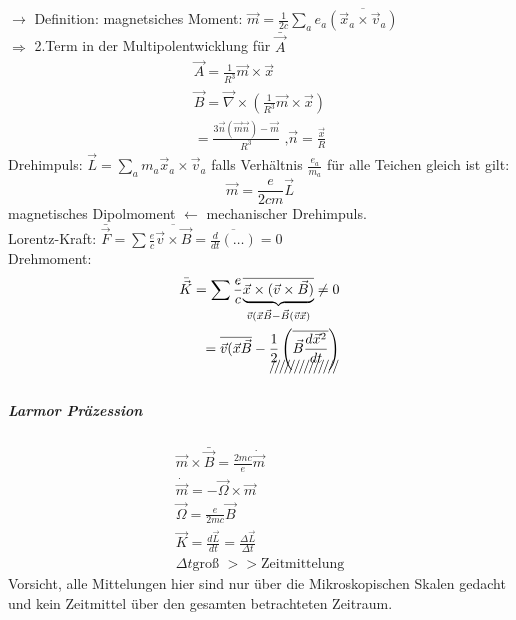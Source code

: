 \documentclass[a4paper]{article}
\begin{document}
$\rightarrow$ Definition:
magnetsiches Moment: $\vec{m}=\frac{1}{2c}\sum_a e_a\overline{\left(
\vec{x}_a\times\vec{v}_a \right)}$\\
$\Rightarrow$ 2.Term in der Multipolentwicklung für $\bar{\vec{A}}$\\
\begin{align}
\vec{A}=\frac{1}{R^3}\vec{m}\times\vec{x}\\
\vec{B}=\vec{\nabla}\times\left( \frac{1}{R^3}\vec{m}\times\vec{x} \right)\\
=\frac{3\vec{n}(\vec{m}\vec{n})-\vec{m}}{R^3}\text{ ,
}\vec{n}=\frac{\vec{x}}{R}
\end{align}
Drehimpuls: $\vec{L}=\sum_a m_a \vec{x}_a\times\vec{v}_a$
falls Verhältnis $\frac{e_a}{m_a}$ für alle Teichen gleich ist gilt:
\begin{equation}
\vec{m}=\frac{e}{2cm}\vec{L}
\end{equation} 
magnetisches Dipolmoment $\leftarrow$ mechanischer Drehimpuls.\\
Lorentz-Kraft: $\bar{\vec{F}}=\sum
\frac{e}{c}\overline{\vec{v}\times\vec{B}}=\overline{\frac{d}{dt}\left(\ldots
\right)}=0$\\
Drehmoment: 
\begin{align}
\bar{\vec{K}}=\sum\frac{e}{c}\overline{\underbrace{\vec{x}\times(\vec{v}
\times\vec{B})}_{\vec{v}(\vec{x}\vec{B}-\vec{B}(\vec{v}\vec{x})}}\neq0\\
=\overline{\vec{v}(\vec{x}\vec{B}}-\xout{\frac{1}{2}\left(
\overline{\vec{B}\frac{d\vec{x}^2}{dt}} \right)}\\
\end{align}
\subparagraph{Larmor Präzession}
\begin{align}
\vec{m}\times\bar{\vec{B}}=\frac{2mc}{e}\dot{\vec{m}}\\
\dot{\vec{m}}=-\vec{\Omega}\times\vec{m}\\
\vec{\Omega}=\frac{e}{2mc}\vec{B}\\
\vec{K}=\frac{d\vec{L}}{dt}=\frac{\Delta\vec{L}}{\Delta t}\\
\Delta t \text{groß }>>\text{Zeitmittelung}
\end{align}
Vorsicht, alle Mittelungen hier sind nur über die Mikroskopischen Skalen gedacht
und kein Zeitmittel über den gesamten betrachteten Zeitraum.
\end{document}
